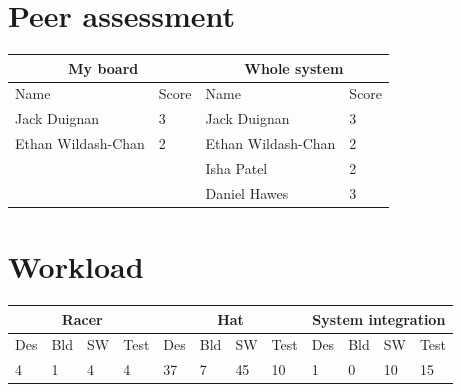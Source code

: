 \documentclass[a4paper,12pt]{article}
\begin{document}
\section{Peer assessment}

\noindent
\begin{tabular}{|l|l||l|l|}
\hline
\multicolumn{2}{|c||}{My board} & \multicolumn{2}{c|}{Whole system} \\
\hline
Name \hspace{5cm} & Score     & Name \hspace{5cm} & Score \\
\hline \hline
Jack Duignan        & 3 & Jack Duignan        &  3 \\ \hline
Ethan Wildash-Chan  & 2 & Ethan Wildash-Chan  &  2 \\ \hline
                    & & Isha Patel            &  2 \\ \cline{3-4}
                    & & Daniel Hawes          &  3 \\ \hline
\end{tabular}

\section{Workload}

\noindent
\begin{tabular}
  {|l|l|l|l||
    l|l|l|l||
    l|l|l|l|}
  \hline
  \multicolumn{4}{|c||}{Racer} &
  \multicolumn{4}{|c||}{Hat} &
  \multicolumn{4}{|c|}{System integration}  \\ \hline
    Des & Bld & SW & Test &
    Des & Bld & SW & Test &
    Des & Bld & SW & Test \\ \hline
    4 & 1 & 4 & 4 &
    37 & 7 & 45 & 10 &
    1 & 0 & 10 & 15 \\ \hline
\end{tabular}
\end{document}
